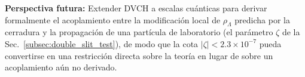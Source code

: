 \documentclass[pdflatex,sn-mathphys-num]{sn-jnl}%
\newif\ifsnclass
\begin{document}
\textbf{Perspectiva futura:} Extender DVCH a escalas cu\'anticas para derivar
formalmente el acoplamiento entre la modificaci\'on local de $\rho_\Lambda$
predicha por la cerradura y la propagaci\'on de una part\'icula de laboratorio
(el par\'ametro $\zeta$ de la Sec.~\ref{subsec:double_slit_test}), de modo que la
cota $|\zeta|<2.3\times10^{-7}$ pueda convertirse en una restricci\'on directa
sobre la teor\'ia en lugar de sobre un acoplamiento a\'un no derivado.

\ifsnclass

\else

\fi


\fussy
\end{document}
